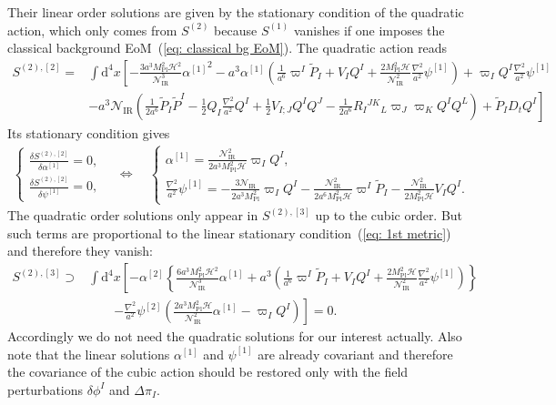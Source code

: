 \documentclass[aps, prd
, preprint
, nofootinbib 
, longbibliography
]{revtex4-1}
\newcommand{\var}[2]{\frac{\delta #1}{\delta #2}}
\newcommand{\dd}{\mathrm{d}}
\newcommand{\Mpl}{M_\mathrm{Pl}}
\newcommand{\IR}{\mathrm{IR}}
\newcommand{\dps}{\displaystyle}
\newcommand{\calH}{\mathcal{H}}
\newcommand{\calN}{\mathcal{N}}
\newcommand{\dphi}{\delta\phi}
\newcommand{\Dpi}{\Delta\pi}
\newcommand{\bae}[1]{\begin{align} #1 \end{align}}
\newcommand{\bce}[1]{\begin{cases} #1 \end{cases}}
\begin{document}
Their linear order solutions are given by the stationary condition of the quadratic action, which only comes from $S^{(2)}$ because $S^{(1)}$ vanishes if one imposes
the classical background EoM~(\ref{eq: classical bg EoM}). The quadratic action reads
\bae{
	S^{(2),[2]}=&\int\dd^4x\left[-\frac{3a^3\Mpl^2\calH^2}{\calN_\IR^3}{\alpha^{[1]}}^2-a^3\alpha^{[1]}\left(\frac{1}{a^6}\varpi^I\tilde{P}_I+V_IQ^I
	+\frac{2\Mpl^2\calH}{\calN_\IR^2}\frac{\nabla^2}{a^2}\psi^{[1]}\right)+\varpi_IQ^I\frac{\nabla^2}{a^2}\psi^{[1]} \right. \nonumber \\
	&\left.-a^3\calN_\IR\left(\frac{1}{2a^6}\tilde{P}_I\tilde{P}^I-\frac{1}{2}Q_I\frac{\nabla^2}{a^2}Q^I+\frac{1}{2}V_{I;J}Q^IQ^J
	-\frac{1}{2a^6}R_I{}^{JK}{}_L\varpi_J\varpi_KQ^IQ^L\right)+\tilde{P}_ID_tQ^I\right]
}
Its stationary condition gives
\bae{\label{eq: 1st metric}
    \bce{
        \dps
        \var{S^{(2),[2]}}{\alpha^{[1]}}=0, \\
        \dps
        \var{S^{(2),[2]}}{\psi^{[1]}}=0,
    } \quad \Leftrightarrow \quad
    \bce{
        \dps
        \alpha^{[1]}=\frac{\calN_\IR^2}{2a^3\Mpl^2\calH}\varpi_IQ^I, \\
        \dps
        \frac{\nabla^2}{a^2}\psi^{[1]}=-\frac{3\calN_\IR}{2a^3\Mpl^2}\varpi_IQ^I-\frac{\calN_\IR^2}{2a^6\Mpl^2\calH}\varpi^I\tilde{P}_I-\frac{\calN_\IR^2}{2\Mpl^2\calH}V_IQ^I.
    }
}
The quadratic order solutions only appear in $S^{(2),[3]}$ up to the cubic order. But such terms are proportional to the linear stationary condition~(\ref{eq: 1st metric}) and therefore they vanish:
\bae{
    S^{(2),[3]}\supset&\int\dd^4x\left[-\alpha^{[2]}\left\{\frac{6a^3\Mpl^2\calH^2}{\calN_\IR^3}\alpha^{[1]}+a^3\left(\frac{1}{a^6}\varpi^I\tilde{P}_I+V_IQ^I+\frac{2\Mpl^2\calH}{\calN_\IR^2}\frac{\nabla^2}{a^2}\psi^{[1]}\right)\right\} \right. \nonumber \\
    &\qquad\left.-\frac{\nabla^2}{a^2}\psi^{[2]}\left(\frac{2a^3\Mpl^2\calH}{\calN_\IR^2}\alpha^{[1]}-\varpi_IQ^I\right)\right]=0.
}
Accordingly we do not need the quadratic solutions for our interest actually. Also note that the linear solutions $\alpha^{[1]}$ and $\psi^{[1]}$ are already covariant and therefore the covariance of the cubic action should be restored only with the field perturbations $\dphi^I$ and $\Dpi_I$.
\end{document}
